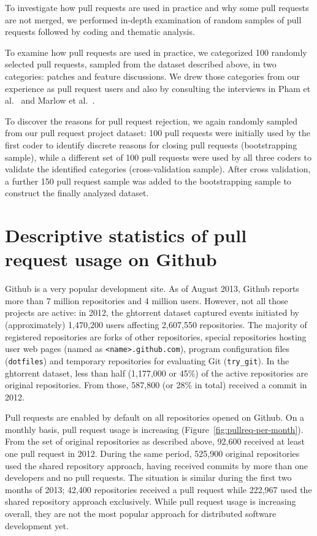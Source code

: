 \documentclass{sig-alternate}
\begin{document}
To investigate how pull requests are used in practice and why some pull requests
are not merged, we performed in-depth examination of random samples of pull
requests followed by coding and thematic analysis. 

To examine how pull requests are used in practice, we categorized
100 randomly selected pull requests, sampled from the dataset described above,
in two categories: patches and feature discussions. We drew those categories
from our experience as pull request users and also by consulting 
the interviews in Pham et al.~\cite{Pham13} and Marlow et al.~\cite{Marlo13}.

To discover the reasons for pull request rejection, we again randomly sampled
from our pull request project dataset: 100 pull requests were initially used by
the first coder to identify discrete reasons for closing pull requests
(bootstrapping sample), while a different set of 100 pull requests were used by
all three coders to validate the identified categories (cross-validation
sample). After cross validation, a further 150 pull request sample was added to
the bootstrapping sample to construct the finally analyzed dataset.

\section{Descriptive statistics of pull request usage on Github}
\label{sec:github}

Github is a very popular development site. As of August 2013, Github reports
more than 7 million repositories and 4 million users. However, not all those
projects are active: in 2012, the {\sc ght}orrent dataset captured events initiated by
(approximately) 1,470,200 users affecting 2,607,550 repositories. The majority
of registered repositories are forks of other repositories, special repositories
hosting user web pages (named as \texttt{<name>.github.com}), program
configuration files (\texttt{dotfiles}) and temporary repositories for
evaluating Git (\texttt{try\_git}). In the {\sc ght}orrent dataset, less than half
(1,177,000 or 45\%) of the active repositories are original repositories. From
those, 587,800 (or 28\% in total) received a commit in 2012.

Pull requests are enabled by default on all repositories opened on Github. On a
monthly basis, pull request usage is increasing
(Figure~\ref{fig:pullreq-per-month}). From the set of original repositories as
described above, 92,600 received at least one pull request in 2012. During the
same period, 525,900 original repositories used the shared repository approach,
having received commits by more than one developers and no pull requests. The
situation is similar during the first two months of 2013; 42,400 repositories
received a pull request while 222,967 used the shared repository approach
exclusively. While pull request usage is increasing overall, they are not the
most popular approach for distributed software development yet.
\end{document}
